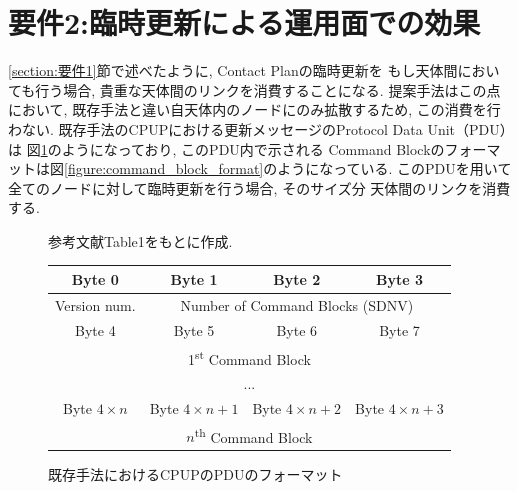 \section{要件2:臨時更新による運用面での効果}
\label{section:要件2}
\ref{section:要件1}節で述べたように, Contact Planの臨時更新を
もし天体間においても行う場合, 貴重な天体間のリンクを消費することになる.
提案手法はこの点において, 既存手法と違い自天体内のノードにのみ拡散するため, 
この消費を行わない. 既存手法のCPUPにおける更新メッセージのProtocol Data Unit（PDU）は
図\ref{figure:cpup_pdu_format}のようになっており, このPDU内で示される
Command Blockのフォーマットは図\ref{figure:command_block_format}のようになっている.
このPDUを用いて全てのノードに対して臨時更新を行う場合, そのサイズ分
天体間のリンクを消費する.

\begin{figure}[htbp]
    \centering
    \caption{既存手法におけるCPUPのPDUのフォーマット}
    \label{figure:cpup_pdu_format}
    \begin{minipage}{\textwidth}
        \centering
        \vspace{1mm} 
        \fontsize{10.5pt}{12pt}\selectfont
        参考文献\cite{Bezirgiannidis2013}Table1をもとに作成. 
        \vspace{1mm} 
    \end{minipage}
    \begin{tabular}{|c|c|c|c|}
      \hline
      Byte 0 & Byte 1 & Byte 2 & Byte 3 \\
      \hline
      \multicolumn{1}{|c|}{Version num.} & \multicolumn{3}{c|}{Number of Command Blocks (SDNV)} \\
      \hline
      Byte 4 & Byte 5 & Byte 6 & Byte 7 \\
      \hline
      \multicolumn{4}{|c|}{1\textsuperscript{st} Command Block} \\
      \hline
      \multicolumn{4}{|c|}{...} \\
      \hline
      Byte $4\times n$ & Byte $4\times n+1$ & Byte $4\times n+2$ & Byte $4\times n+3$ \\
      \hline
      \multicolumn{4}{|c|}{$n$\textsuperscript{th} Command Block} \\
      \hline
    \end{tabular}
  \end{figure}
